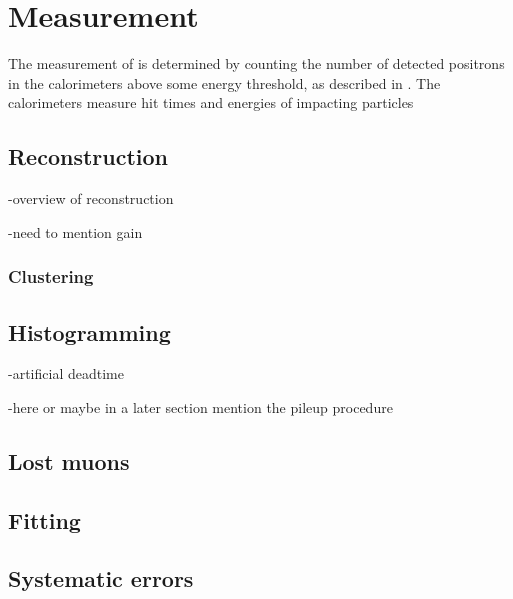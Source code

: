 
\chapter{\texorpdfstring{\wa}{wa} Measurement}
\label{chapter:SpinPrecessionMeasurement}
\thispagestyle{myheadings}


The measurement of \wa is determined by counting the number of detected positrons in the calorimeters above some energy threshold, as described in . The calorimeters measure hit times and energies of impacting particles






\section{Reconstruction}
\label{sec:ReconWest}

-overview of reconstruction

-need to mention gain


\cite{AFThesis}

\subsection{Clustering}
\label{sec:Clustering}

\section{Histogramming}
\label{sec:Histogramming}


-artificial deadtime

-here or maybe in a later section mention the pileup procedure


\section{Lost muons}
\label{sec:lostmuons}

\section{Fitting}
\label{sec:Fitting}

\section{Systematic errors}
\label{sec:Systematic Errors}



\cleardoublepage

